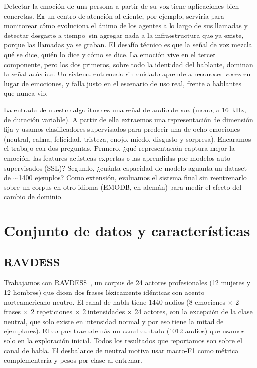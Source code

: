 \documentclass[conference]{IEEEtran}
\begin{document}
Detectar la emoción de una persona a partir de su voz tiene aplicaciones bien
concretas. En un centro de atención al cliente, por ejemplo, serviría para
monitorear cómo evoluciona el ánimo de los agentes a lo largo de sus llamadas
y detectar desgaste a tiempo, sin agregar nada a la infraestructura que ya
existe, porque las llamadas ya se graban. El desafío técnico es que la señal
de voz mezcla qué se dice, quién lo dice y cómo se dice. La emoción vive en
el tercer componente, pero los dos primeros, sobre todo la identidad del
hablante, dominan la señal acústica. Un sistema entrenado sin cuidado aprende
a reconocer voces en lugar de emociones, y falla justo en el escenario de uso
real, frente a hablantes que nunca vio.

La entrada de nuestro algoritmo es una señal de audio de voz (mono, a
16~kHz, de duración variable). A partir de ella extraemos una representación
de dimensión fija y usamos clasificadores supervisados para predecir una de
ocho emociones (neutral, calma, felicidad, tristeza, enojo, miedo, disgusto y
sorpresa). Encaramos el trabajo con dos preguntas. Primero, ¿qué
representación captura mejor la emoción, las features acústicas expertas o
las aprendidas por modelos auto-supervisados (SSL)? Segundo, ¿cuánta
capacidad de modelo aguanta un dataset de $\sim$1400 ejemplos? Como
extensión, evaluamos el sistema final sin reentrenarlo sobre un corpus en
otro idioma (EMODB, en alemán) para medir el efecto del cambio de dominio.

\section{Conjunto de datos y características}

\subsection{RAVDESS}

Trabajamos con RAVDESS~\cite{ravdess}, un corpus de 24 actores profesionales
(12 mujeres y 12 hombres) que dicen dos frases léxicamente idénticas con
acento norteamericano neutro. El canal de habla tiene 1440 audios (8
emociones $\times$ 2 frases $\times$ 2 repeticiones $\times$ 2 intensidades
$\times$ 24 actores, con la excepción de la clase neutral, que solo existe
en intensidad normal y por eso tiene la mitad de ejemplares). El corpus trae
además un canal cantado (1012 audios) que usamos solo en la exploración
inicial. Todos los resultados que reportamos son sobre el canal de habla. El
desbalance de neutral motiva usar macro-F1 como métrica complementaria y
pesos por clase al entrenar.
\end{document}
